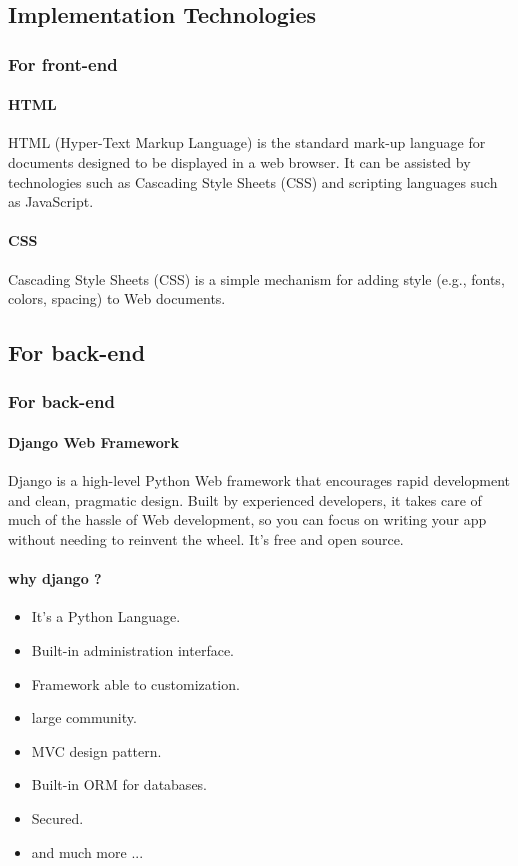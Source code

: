 \documentclass[12pt,a4paper]{article}
\begin{document}
	\subsection{Implementation Technologies}
	\subsubsection{For front-end}
	\paragraph{HTML}
	HTML (Hyper-Text Markup Language) is the standard mark-up language for documents designed to be displayed in a web browser. It can be assisted by technologies such as Cascading Style Sheets (CSS) and scripting languages such as JavaScript.\cite{HTML}
	\paragraph{CSS}
	Cascading Style Sheets (CSS) is a simple mechanism for adding style (e.g., fonts, colors, spacing) to Web documents.\cite{CSS}
	\subsection{For back-end}
	\subsubsection{For back-end}
	\paragraph{Django Web Framework}
	Django is a high-level Python Web framework that encourages rapid development and clean, pragmatic design. Built by experienced developers, it takes care of much of the hassle of Web development, so you can focus on writing your app without needing to reinvent the wheel. It’s free and open source.\cite{Django}
	\paragraph{why django ?}
	\begin{itemize}
		\item It's a Python Language.
		\item Built-in administration interface.
		\item Framework able to customization.
		\item large community.
		\item MVC design pattern.
		\item Built-in ORM for databases.
		\item Secured.
		\item and much more ...
	\end{itemize}
\end{document}
